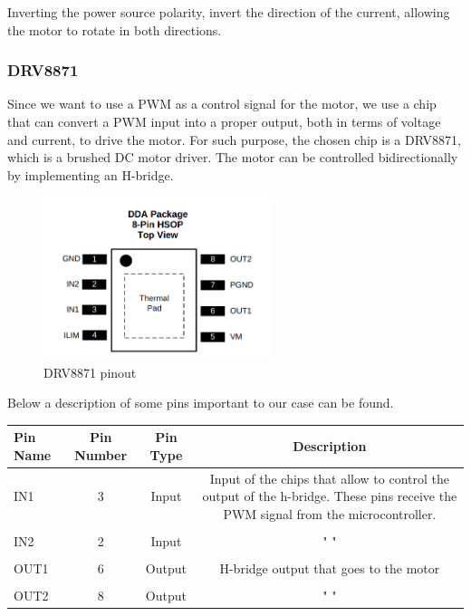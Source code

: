 \documentclass[english]{article}
\begin{document}
Inverting the power source polarity, invert the direction of the current, allowing 
the motor to rotate in both directions. 
\subsubsection{DRV8871}
Since we want to use a PWM as a control signal for the motor, we use a chip that can 
convert a PWM input into a proper output, both in terms of voltage and current, to 
drive the motor. For such purpose, the chosen chip is a DRV8871, which is a brushed
DC motor driver. The motor can be controlled bidirectionally by implementing an
H-bridge. 
\begin{figure}[!h]
    \centering
    \includegraphics[width=0.60\textwidth, height=0.30\textheight]{figures/DRV.png}
    \caption{DRV8871 pinout}
    \label{fig:drv}
\end{figure}
\newpage
Below a description of some pins important to our case can be found. \newline
\begin{center}    
    \begin{tabular}{lS[table-format=3]cS[table-format=2.2]}
        \toprule
        \textbf{Pin Name} & \textbf{Pin Number} & \textbf{Pin Type} & \textbf{Description} \\
        \midrule
        IN1 & 3 & Input & \parbox{5cm}{Input of the chips that allow to control the output of the h-bridge. These pins receive the PWM signal from the microcontroller.}  \\ \\
        IN2 & 2 & Input & " "\\ \\
        OUT1 & 6 & Output & \parbox{5cm}{H-bridge output that goes to the motor}  \\ \\
        OUT2 & 8 & Output & " " \\
        \bottomrule
    \end{tabular}
\end{center}
\end{document}
